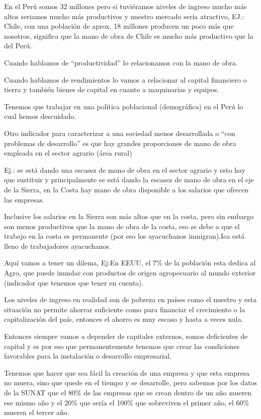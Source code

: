 \documentclass[
  a4paper,
]{article}
\begin{document}
En el Perú somos 32 millones pero si tuviéramos niveles de ingreso mucho
más altos seriamos mucho más productivos y nuestro mercado seria
atractivo, EJ.: Chile, con una población de aprox. 18 millones producen
un poco más que nosotros, significa que la mano de obra de Chile es
mucho más productivo que la del Perú.

Cuando hablamos de ``productividad'' lo relacionamos con la mano de
obra.

Cuando hablamos de rendimientos lo vamos a relacionar al capital
financiero o tierra y también bienes de capital en cuanto a maquinarias
y equipos.

Tenemos que trabajar en una política poblacional (demográfica) en el
Perú lo cual hemos descuidado.

Otro indicador para caracterizar a una sociedad menos desarrollada o
``con problemas de desarrollo'' es que hay grandes proporciones de mano
de obra empleada en el sector agrario (área rural)

Ej.: se está dando una escasez de mano de obra en el sector agrario y
esto hay que sustituir y principalmente se está dando la escasez de mano
de obra en el eje de la Sierra, en la Costa hay mano de obra disponible
a los salarios que ofrecen las empresas.

Inclusive los salarios en la Sierra son más altos que en la costa, pero
sin embargo son menos productivos que la mano de obra de la costa, eso
se debe a que el trabajo en la costa es permanente (por eso los
ayacuchanos inmigran).Ica está lleno de trabajadores ayacuchanos.

Aquí vamos a tener un dilema, Ej:En EEUU, el 7\% de la población esta
dedica al Agro, que puede inundar con productos de origen agropecuario
al mundo exterior (indicador que tenemos que tener en cuenta).

Los niveles de ingreso en realidad son de pobreza en países como el
nuestro y esta situación no permite ahorrar suficiente como para
financiar el crecimiento o la capitalización del país, entonces el
ahorro es muy escaso y hasta a veces nula.

Entonces siempre vamos a depender de capitales externos, somos
deficientes de capital y es por eso que permanentemente tenemos que
crear las condiciones favorables para la instalación o desarrollo
empresarial.

Tenemos que hacer que sea fácil la creación de una empresa y que esta
empresa no muera, sino que quede en el tiempo y se desarrolle, pero
sabemos por los datos de la SUNAT que el 80\% de las empresas que se
crean dentro de un año mueren ese mismo año y el 20\% que sería el 100\%
que sobreviven el primer año, el 60\% mueren el tercer año.
\end{document}
